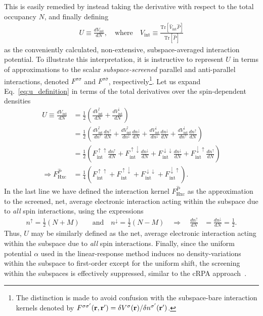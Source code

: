 This is easily remedied by instead 
taking the derivative with respect 
to the total occupancy $N$, 
and finally defining 
%
\begin{align}
U \equiv \frac{d V_\textrm{int} }{d  N},
 \quad \mbox{where}\quad
V_\textrm{int} \equiv \frac{ \textrm{Tr} [\hat{V}_\textrm{int} \hat{P}]}{ \textrm{Tr} [  \hat{P} ] }
\label{eq:u_definition}
\end{align} 
%
as the conveniently calculated, non-extensive,
subspace-averaged interaction potential.
%
To illustrate this interpretation, 
it is instructive to represent $U$ in terms of  
{approximations to the scalar {\it subspace-screened}} 
parallel and anti-parallel interactions, denoted 
$F^{\sigma\sigma}$ and $F^{\sigma\bar{\sigma}}$, 
respectively\footnote{{The distinction is made 
to avoid confusion with the subspace-bare interaction kernels 
denoted by $F^{\sigma\sigma'}({\bf r},{\bf r}')=\delta V^\sigma({\bf r})/\delta n^{\sigma'}({\bf r}')$.}}.
%
Let us expand Eq.~\eqref{eq:u_definition} 
in terms of the {total} derivatives 
over the spin-dependent densities  
%
\begin{align}
U\equiv\frac{dV_\textrm{int}}{dN}&
=\frac{1}{2}\left(\frac{dV_\textrm{int}^\uparrow}{dN}+\frac{dV_\textrm{int}^\downarrow}{dN}\right)\nonumber \\[0.75em]
&=\frac{1}{2}\left(\frac{d V_\textrm{int}^\uparrow}{d n^\uparrow}\frac{dn^\uparrow}{dN}
+\frac{d V_\textrm{int}^\uparrow}{d n^\downarrow}\frac{dn^\downarrow}{dN}+
\frac{d V_\textrm{int}^\downarrow}{d n^\downarrow}\frac{dn^\downarrow}{dN}+
\frac{d V_\textrm{int}^\downarrow}{d n^\uparrow}\frac{dn^\uparrow}{dN}\right)\nonumber \\[0.75em]
&=\frac{1}{2}\left(F_\textrm{int}^{\uparrow\uparrow}\frac{dn^\uparrow}{dN}
+F_\textrm{int}^{\uparrow\downarrow}\frac{dn^\downarrow}{dN}+
F_\textrm{int}^{\downarrow\downarrow}\frac{dn^\downarrow}{dN}+
F_\textrm{int}^{\downarrow\uparrow}\frac{dn^\uparrow}{dN}\right)\nonumber \\[0.75em]
\Rightarrow F^{\hat{P}}_\textrm{Hxc}
&=\frac{1}{4}\left(F_\textrm{int}^{\uparrow\uparrow}+F_\textrm{int}^{\uparrow\downarrow}
+F_\textrm{int}^{\downarrow\downarrow}+F_\textrm{int}^{\downarrow\uparrow}\right). 
\label{eq:u_interaction}
\end{align}
%
In the last line we have defined the 
interaction kernel $F^{\hat{P}}_\textrm{Hxc}$ 
as the approximation to the screened, 
net, average electronic interaction 
acting within the subspace 
due to {\it all} spin interactions, 
using the expressions
%
\begin{align}
n^\uparrow=\frac{1}{2}(N+M)
\quad&\mbox{and}\quad
n^\downarrow=\frac{1}{2}(N-M)
\quad \Rightarrow\quad
\frac{dn^\uparrow}{dN}&=\frac{dn^\downarrow}{dN}=\frac{1}{2}.
\end{align}
%
Thus, 
$U$ may be similarly defined as the 
net, average electronic interaction 
acting within the subspace 
due to {\it all} spin interactions.
%
Finally, 
since the uniform potential $\alpha$ 
used in the linear-response method 
induces no density-variations 
within the subspace to first-order
except for the uniform shift, 
the screening within the subspaces is effectively suppressed, 
similar to the  cRPA 
approach~\cite{PhysRevB.74.125106,PhysRevB.77.085122,PhysRevB.80.155134}.


